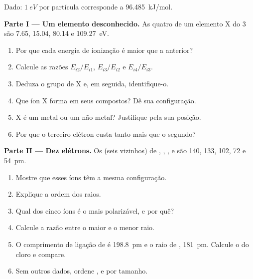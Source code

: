 \begin{problem}
\label{pb:b1:periodicity:1}
Dado: $\qty{1}{eV}$ por partícula corresponde a \qty{96.485}{kJ/mol}.

\medskip
\noindent\textbf{Parte I --- Um elemento desconhecido.}
As quatro  de um elemento X do  3
são 7.65, 15.04, 80.14 e \qty{109.27}{eV}.
\begin{enumerate}
  \item Por que cada energia de ionização é maior que a anterior?
  \item Calcule as razões $E_{i2}/E_{i1}$, $E_{i3}/E_{i2}$ e
        $E_{i4}/E_{i3}$.
  \item Deduza o grupo de X e, em seguida, identifique-o.
  \item Que íon X forma em seus compostos? Dê sua configuração.
  \item X é um metal ou um não metal? Justifique pela sua posição.
  \item Por que o terceiro elétron custa tanto mais que o segundo?
\end{enumerate}

\medskip
\noindent\textbf{Parte II --- Dez elétrons.}
Os  (seis vizinhos) de , , ,
 e  são 140, 133, 102, 72 e \qty{54}{pm}.
\begin{enumerate}[resume]
  \item Mostre que esses íons têm a mesma configuração.
  \item Explique a ordem dos raios.
  \item Qual dos cinco íons é o mais polarizável, e por quê?
  \item Calcule a razão entre o maior e o menor raio.
  \item O comprimento de ligação de  é \qty{198.8}{pm} e o raio de
        , \qty{181}{pm}. Calcule o  do cloro
        e compare.
  \item Sem outros dados, ordene ,  e 
        por tamanho.
\end{enumerate}


\end{problem}
